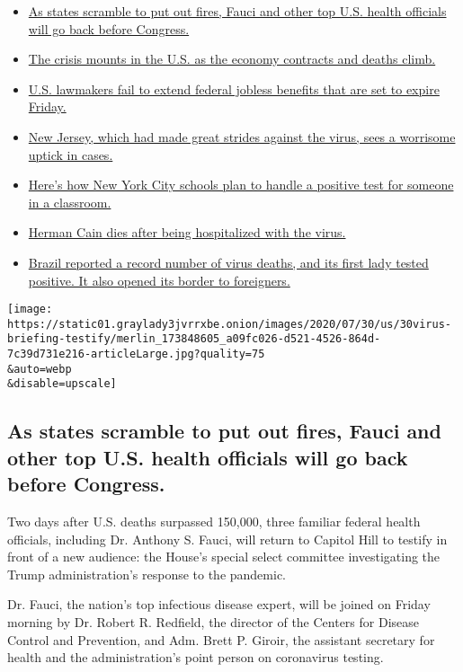 \begin{itemize}
\tightlist
\item
  \protect\hyperlink{link-3d16bd29}{As states scramble to put out fires,
  Fauci and other top U.S. health officials will go back before
  Congress.}
\item
  \protect\hyperlink{link-5f1140f}{The crisis mounts in the U.S. as the
  economy contracts and deaths climb.}
\item
  \protect\hyperlink{link-59ffb834}{U.S. lawmakers fail to extend
  federal jobless benefits that are set to expire Friday.}
\item
  \protect\hyperlink{link-3cc76879}{New Jersey, which had made great
  strides against the virus, sees a worrisome uptick in cases.}
\item
  \protect\hyperlink{link-177c5cda}{Here's how New York City schools
  plan to handle a positive test for someone in a classroom.}
\item
  \protect\hyperlink{link-e01ef62}{Herman Cain dies after being
  hospitalized with the virus.}
\item
  \protect\hyperlink{link-6923e1fe}{Brazil reported a record number of
  virus deaths, and its first lady tested positive. It also opened its
  border to foreigners.}
\end{itemize}

\texttt{[image: https://static01.graylady3jvrrxbe.onion/images/2020/07/30/us/30virus-briefing-testify/merlin\_173848605\_a09fc026-d521-4526-864d-7c39d731e216-articleLarge.jpg?quality=75\\\&auto=webp\\\&disable=upscale]}

\hypertarget{as-states-scramble-to-put-out-fires-fauci-and-other-top-us-health-officials-will-go-back-before-congress}{%
\subsection{As states scramble to put out fires, Fauci and other top
U.S. health officials will go back before
Congress.}\label{as-states-scramble-to-put-out-fires-fauci-and-other-top-us-health-officials-will-go-back-before-congress}}

Two days after U.S. deaths surpassed 150,000, three familiar federal
health officials, including Dr. Anthony S. Fauci, will return to Capitol
Hill to testify in front of a new audience: the House's special select
committee investigating the Trump administration's response to the
pandemic.

Dr. Fauci, the nation's top infectious disease expert, will be joined on
Friday morning by Dr. Robert R. Redfield, the director of the Centers
for Disease Control and Prevention, and Adm. Brett P. Giroir, the
assistant secretary for health and the administration's point person on
coronavirus testing.

